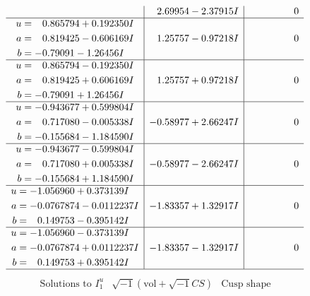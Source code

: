\documentclass[1p]{elsarticle_modified}
\theoremstyle{definition}
\newcommand{\I}{\sqrt{-1}}
\begin{document}
$$\begin{array}{c|c|c}
 & \phantom{-}2.69954 - 2.37915 I & \phantom{-0.000000 } 0 \\ \hline\begin{aligned}
u &= \phantom{-}0.865794 + 0.192350 I \\
a &= \phantom{-}0.819425 - 0.606169 I \\
b &= -0.79091 - 1.26456 I\end{aligned}
 & \phantom{-}1.25757 - 0.97218 I & \phantom{-0.000000 } 0 \\ \hline\begin{aligned}
u &= \phantom{-}0.865794 - 0.192350 I \\
a &= \phantom{-}0.819425 + 0.606169 I \\
b &= -0.79091 + 1.26456 I\end{aligned}
 & \phantom{-}1.25757 + 0.97218 I & \phantom{-0.000000 } 0 \\ \hline\begin{aligned}
u &= -0.943677 + 0.599804 I \\
a &= \phantom{-}0.717080 - 0.005338 I \\
b &= -0.155684 - 1.184590 I\end{aligned}
 & -0.58977 + 2.66247 I & \phantom{-0.000000 } 0 \\ \hline\begin{aligned}
u &= -0.943677 - 0.599804 I \\
a &= \phantom{-}0.717080 + 0.005338 I \\
b &= -0.155684 + 1.184590 I\end{aligned}
 & -0.58977 - 2.66247 I & \phantom{-0.000000 } 0 \\ \hline\begin{aligned}
u &= -1.056960 + 0.373139 I \\
a &= -0.0767874 - 0.0112237 I \\
b &= \phantom{-}0.149753 - 0.395142 I\end{aligned}
 & -1.83357 + 1.32917 I & \phantom{-0.000000 } 0 \\ \hline\begin{aligned}
u &= -1.056960 - 0.373139 I \\
a &= -0.0767874 + 0.0112237 I \\
b &= \phantom{-}0.149753 + 0.395142 I\end{aligned}
 & -1.83357 - 1.32917 I & \phantom{-0.000000 } 0\\
 \hline 
 \end{array}$$\newpage$$\begin{array}{c|c|c}  
\text{Solutions to }I^u_{1}& \I (\text{vol} + \sqrt{-1}CS) & \text{Cusp shape}\\

\end{array}$$
\end{document}

